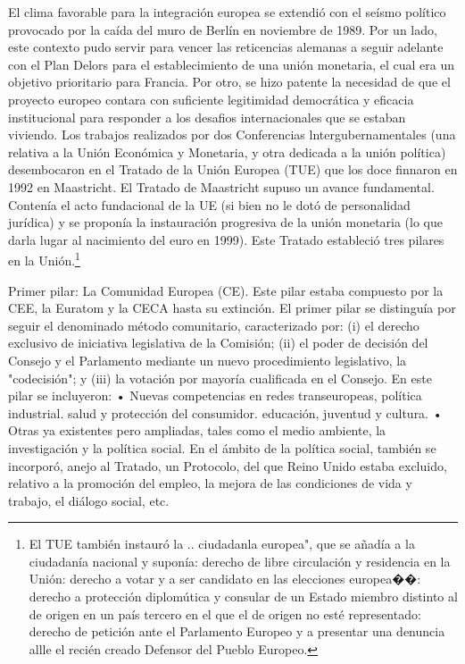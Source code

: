 \documentclass[10pt,a4paper]{article}
\begin{document}
El clima favorable para la integración europea se extendió con el seísmo político provocado por la caída del muro de Berlín en noviembre de 1989. Por un lado, este contexto pudo servir para vencer las reticencias alemanas a seguir adelante con el Plan Delors para el establecimiento de una unión monetaria, el cual era un objetivo prioritario para Francia. Por otro, se hizo patente la necesidad de que el proyecto europeo contara con suficiente legitimidad democrática y eficacia institucional para responder a los desafios internacionales que se estaban viviendo. Los trabajos realizados por dos Conferencias lntergubernamentales (una relativa a la Unión Económica y Monetaria, y otra dedicada a la unión política) desembocaron en el Tratado de la Unión Europea (TUE) que los doce finnaron en 1992 en Maastricht. El Tratado de Maastricht supuso un avance fundamental. Contenía el acto fundacional de la UE (si bien no le dotó de personalidad jurídica) y se proponía la instauración progresiva de la unión monetaria (lo que darla lugar al nacimiento del euro en 1999). Este Tratado estableció tres pilares en la Unión.\footnote{%
    El TUE también instauró la .. ciudadanla europea", que se añadía a la ciudadanía nacional y suponía: derecho de libre circulación y residencia en la Unión: derecho a votar y a ser candidato en las elecciones europea��: derecho a protección diplomútica y consular de un Estado miembro distinto al de origen en un país tercero en el que el de origen no esté representado: derecho de petición ante el Parlamento Europeo y a presentar una denuncia allle el recién creado Defensor del Pueblo Europeo.
}

Primer pilar: La Comunidad Europea (CE). Este pilar estaba compuesto por la CEE, la Euratom y la CECA hasta su extinción. El primer pilar se distinguía por seguir el denominado método comunitario, caracterizado por: (i) el derecho exclusivo de iniciativa legislativa de la Comisión; (ii) el poder de decisión del Consejo y el Parlamento mediante un nuevo procedimiento legislativo, la "codecisión"; y (iii) la votación por mayoría cualificada en el Consejo. En este pilar se incluyeron: • Nuevas competencias en redes transeuropeas, política industrial. salud y protección del consumidor. educación, juventud y cultura. • Otras ya existentes pero ampliadas, tales como el medio ambiente, la investigación y la política social. En el ámbito de la política social, también se incorporó, anejo al Tratado, un Protocolo, del que Reino Unido estaba excluido, relativo a la promoción del empleo, la mejora de las condiciones de vida y trabajo, el diálogo social, etc.
\end{document}
